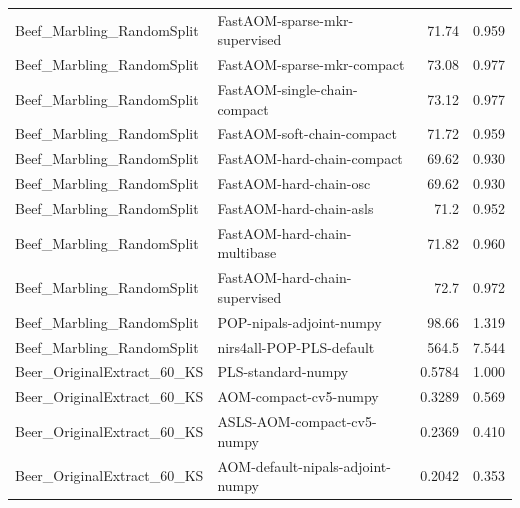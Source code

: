 \begin{landscape}
\begin{longtable}{L{8.0cm}L{9.5cm}rr}
Beef\_\allowbreak{}Marbling\_\allowbreak{}RandomSplit & FastAOM-\allowbreak{}sparse-\allowbreak{}mkr-\allowbreak{}supervised & 71.74 & 0.959 \\
Beef\_\allowbreak{}Marbling\_\allowbreak{}RandomSplit & FastAOM-\allowbreak{}sparse-\allowbreak{}mkr-\allowbreak{}compact & 73.08 & 0.977 \\
Beef\_\allowbreak{}Marbling\_\allowbreak{}RandomSplit & FastAOM-\allowbreak{}single-\allowbreak{}chain-\allowbreak{}compact & 73.12 & 0.977 \\
Beef\_\allowbreak{}Marbling\_\allowbreak{}RandomSplit & FastAOM-\allowbreak{}soft-\allowbreak{}chain-\allowbreak{}compact & 71.72 & 0.959 \\
Beef\_\allowbreak{}Marbling\_\allowbreak{}RandomSplit & FastAOM-\allowbreak{}hard-\allowbreak{}chain-\allowbreak{}compact & 69.62 & 0.930 \\
Beef\_\allowbreak{}Marbling\_\allowbreak{}RandomSplit & FastAOM-\allowbreak{}hard-\allowbreak{}chain-\allowbreak{}osc & 69.62 & 0.930 \\
Beef\_\allowbreak{}Marbling\_\allowbreak{}RandomSplit & FastAOM-\allowbreak{}hard-\allowbreak{}chain-\allowbreak{}asls & 71.2 & 0.952 \\
Beef\_\allowbreak{}Marbling\_\allowbreak{}RandomSplit & FastAOM-\allowbreak{}hard-\allowbreak{}chain-\allowbreak{}multibase & 71.82 & 0.960 \\
Beef\_\allowbreak{}Marbling\_\allowbreak{}RandomSplit & FastAOM-\allowbreak{}hard-\allowbreak{}chain-\allowbreak{}supervised & 72.7 & 0.972 \\
Beef\_\allowbreak{}Marbling\_\allowbreak{}RandomSplit & POP-\allowbreak{}nipals-\allowbreak{}adjoint-\allowbreak{}numpy & 98.66 & 1.319 \\
Beef\_\allowbreak{}Marbling\_\allowbreak{}RandomSplit & nirs4all-\allowbreak{}POP-\allowbreak{}PLS-\allowbreak{}default & 564.5 & 7.544 \\
Beer\_\allowbreak{}OriginalExtract\_\allowbreak{}60\_\allowbreak{}KS & PLS-\allowbreak{}standard-\allowbreak{}numpy & 0.5784 & 1.000 \\
Beer\_\allowbreak{}OriginalExtract\_\allowbreak{}60\_\allowbreak{}KS & AOM-\allowbreak{}compact-\allowbreak{}cv5-\allowbreak{}numpy & 0.3289 & 0.569 \\
Beer\_\allowbreak{}OriginalExtract\_\allowbreak{}60\_\allowbreak{}KS & ASLS-\allowbreak{}AOM-\allowbreak{}compact-\allowbreak{}cv5-\allowbreak{}numpy & 0.2369 & 0.410 \\
Beer\_\allowbreak{}OriginalExtract\_\allowbreak{}60\_\allowbreak{}KS & AOM-\allowbreak{}default-\allowbreak{}nipals-\allowbreak{}adjoint-\allowbreak{}numpy & 0.2042 & 0.353 \\

\end{longtable}
\end{landscape}
